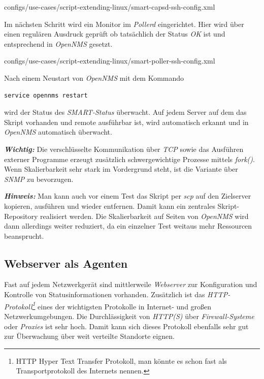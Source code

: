 
  {configs/use-cases/script-extending-linux/smart-capsd-ssh-config.xml}

Im nächsten Schritt wird ein Monitor im \emph{Pollerd} eingerichtet. Hier wird über einen regulären Ausdruck geprüft ob tatsächlich der Status \emph{OK} ist und entsprechend in \emph{OpenNMS} gesetzt.


  {configs/use-cases/script-extending-linux/smart-poller-ssh-config.xml}

Nach einem Neustart von \emph{OpenNMS} mit dem Kommando

\begin{lstlisting}[numbers=none]
service opennms restart
\end{lstlisting}

wird der Status des \emph{SMART-Status} überwacht. Auf jedem Server auf dem das Skript vorhanden und remote ausführbar ist, wird automatisch erkannt und in \emph{OpenNMS} automatisch überwacht.

\textbf{\textit{Wichtig:}} Die verschlüsselte Kommunikation über \emph{TCP} sowie das Ausführen externer Programme erzeugt zusätzlich schwergewichtige Prozesse mittels \emph{fork()}. Wenn Skalierbarkeit sehr stark im Vordergrund steht, ist die Variante über \emph{SNMP} zu bevorzugen.

\textbf{\textit{Hinweis:}} Man kann auch vor einem Test das Skript per \emph{scp} auf den Zielserver kopieren, ausführen und wieder entfernen. Damit kann ein zentrales Skript-Repository realisiert werden. Die Skalierbarkeit auf Seiten von \emph{OpenNMS} wird dann allerdings weiter reduziert, da ein einzelner Test weitaus mehr Ressourcen beansprucht.

\subsection{Webserver als Agenten}
Fast auf jedem Netzwerkgerät sind mittlerweile \emph{Webserver} zur Konfiguration und Kontrolle von Statusinformationen vorhanden. Zusätzlich ist das \emph{HTTP-Protokoll\footnote{HTTP Hyper Text Transfer Protokoll, man könnte es schon fast als Transportprotokoll des Internets nennen.}} eines der wichtigsten Protokolle in Internet- und großen Netzwerkumgebungen. Die Durchlässigkeit von \emph{HTTP(S)} über \emph{Firewall-Systeme} oder \emph{Proxies} ist sehr hoch. Damit kann sich dieses Protokoll ebenfalls sehr gut zur Überwachung über weit verteilte Standorte eignen.

